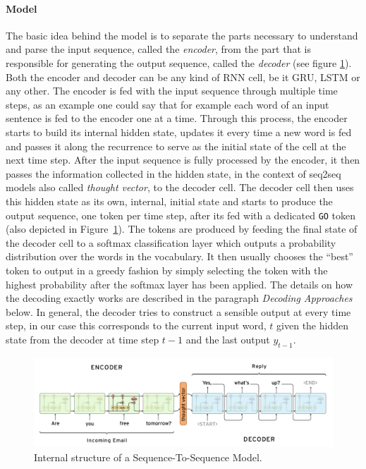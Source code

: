 \paragraph{Model}
The basic idea behind the model is to separate the parts necessary to understand and parse the input sequence, called the \emph{encoder}, from the part that is responsible for generating the output sequence, called the \emph{decoder} (see figure \ref{fundamentals:seq2seq:internal_structure}). Both the encoder and decoder can be any kind of RNN cell, be it GRU, LSTM or any other. The encoder is fed with the input sequence through multiple time steps, as an example one could say that for example each word of an input sentence is fed to the encoder one at a time. Through this process, the encoder starts to build its internal hidden state, updates it every time a new word is fed and passes it along the recurrence to serve as the initial state of the cell at the next time step. After the input sequence is fully processed by the encoder, it then passes the information collected in the hidden state, in the context of seq2seq models also called \emph{thought vector}, to the decoder cell. The decoder cell then uses this hidden state as its own, internal, initial state and starts to produce the output sequence, one token per time step, after its fed with a dedicated \texttt{GO} token (also depicted in Figure~\ref{fundamentals:seq2seq:internal_structure}). The tokens are produced by feeding the final state of the decoder cell to a softmax classification layer which outputs a probability distribution over the words in the vocabulary. It then usually chooses the ``best'' token to output in a greedy fashion by simply selecting the token with the highest probability after the softmax layer has been applied. The details on how the decoding exactly works are described in the paragraph \emph{Decoding Approaches} below. In general, the decoder tries to construct a sensible output at every time step, in our case this corresponds to the current input word, $t$ given the hidden state from the decoder at time step $t-1$ and the last output $y_{t-1}$.

\begin{figure}[h]
	\centering
	\includegraphics[width=14cm]{img/seq2seq_internal}
	\caption{Internal structure of a Sequence-To-Sequence Model.\protect\footnotemark}
	\label{fundamentals:seq2seq:internal_structure}
\end{figure}

